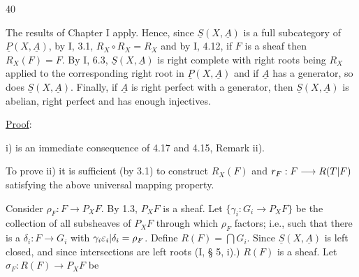 \hfill 40

The results of Chapter I apply. Hence, since $\underline S(X,\underline A)$ is a full subcategory of $\underline P(X,\underline A)$, by I, 3.1, $R_X\circ R_X=R_X$ and by I, 4.12, if $F$ is a sheaf then $R_X(F)=F$. By I, 6.3, $\underline S(X,\underline A)$ is right complete with right roots being $R_X$ applied to the corresponding right root in $\underline P(X,\underline A)$ and if $\underline A$ has a generator, so does $\underline S(X,\underline A)$. Finally, if $\underline A$ is right perfect with a generator, then $\underline S(X,\underline A)$ is abelian, right perfect and has enough injectives.

\uline{Proof}:

i) is an immediate consequence of 4.17 and 4.15, Remark ii).

To prove ii) it is sufficient (by 3.1) to construct $R_X(F)$ and $r_F:F\longrightarrow R(\relax{T|F})$ satisfying the above universal mapping property.

Consider $\rho_F:F\longrightarrow P_XF$. By 1.3, $P_XF$ is a sheaf. Let $\{\gamma_i:G_i\longrightarrow P_XF\}$ be the collection of all subsheaves of $P_XF$ through which $\rho_F$ factors; i.e., such that there is a $\delta_i:F\longrightarrow G_i$ with $\gamma_i\relax{\varepsilon_i|\delta_i}=\rho_F$. Define $R(F)=\bigcap G_i$. Since
$\underline S(X,\underline A)$ is left closed, and since intersections are left roots (I, § 5, i).) $R(F)$ is a sheaf. Let $\sigma_F:R(F)\longrightarrow P_XF$ be
